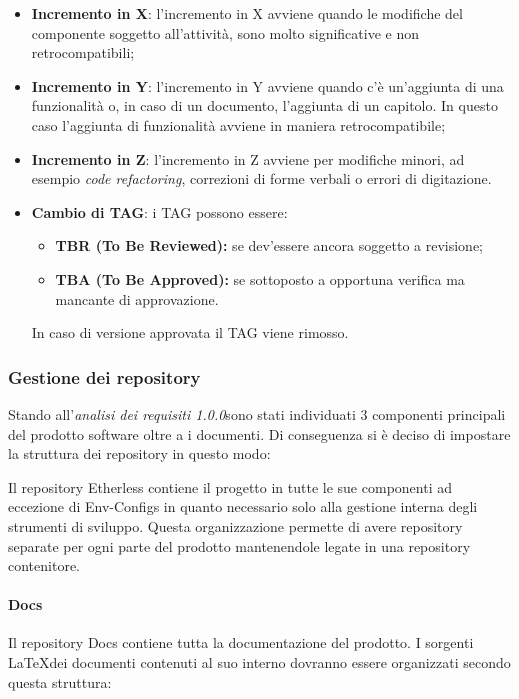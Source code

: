 \begin{itemize}
  \item \textbf{Incremento in X}: l'incremento in X avviene quando le modifiche del componente soggetto all'attività, sono molto significative e non retrocompatibili;
  \item \textbf{Incremento in Y}: l'incremento in Y avviene quando c'è un'aggiunta
  di una funzionalità o, in caso di un documento, l'aggiunta di un capitolo. In questo caso l'aggiunta di funzionalità avviene in maniera retrocompatibile;
  \item \textbf{Incremento in Z}: l'incremento in Z avviene per modifiche minori,
  ad esempio \textit{code refactoring\glos}, correzioni di forme verbali o errori di digitazione.
  \item \textbf{Cambio di TAG}: i TAG possono essere:
  \begin{itemize}
  	\item \textbf{TBR (To Be Reviewed):} se dev'essere ancora soggetto a revisione;
  	\item \textbf{TBA (To Be Approved):} se sottoposto a opportuna verifica ma mancante di approvazione.
  \end{itemize}
  In caso di versione approvata il TAG viene rimosso.
\end{itemize}


\subsubsection{Gestione dei repository}
Stando all'\textit{analisi dei requisiti 1.0.0}\doc sono stati individuati
3 componenti principali del prodotto software oltre a i documenti.
Di conseguenza si è deciso di impostare la struttura dei repository in questo modo:



Il repository Etherless contiene il progetto in tutte le sue componenti
ad eccezione di Env-Configs in quanto necessario solo alla gestione interna
degli strumenti di sviluppo. Questa organizzazione permette di avere repository separate per ogni parte
del prodotto mantenendole legate in una repository contenitore.

\paragraph{Docs}
Il repository Docs contiene tutta la documentazione del prodotto. I sorgenti \LaTeX \space dei documenti contenuti al suo interno dovranno essere organizzati secondo questa struttura:\\\\

